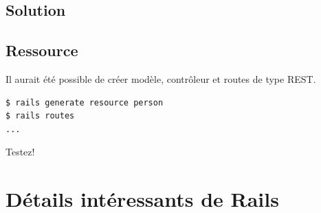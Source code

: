 \hypertarget{solution-4}{%
\subsection{Solution}\label{solution-4}}

\begin{english}

\begin{Shaded}
\begin{Highlighting}[]

\NormalTok{, \textbackslash{}}
\NormalTok{, \textbackslash{}}
    \NormalTok{[}\NormalTok{, }\NormalTok{]}
\end{Highlighting}
\end{Shaded}

\end{english}

\hypertarget{ressource}{%
\subsection{Ressource}\label{ressource}}

Il aurait été possible de créer modèle, contrôleur et routes de type
REST.

\begin{english}

\begin{verbatim}
$ rails generate resource person
$ rails routes
...
\end{verbatim}

\end{english}

Testez!

\hypertarget{duxe9tails-intuxe9ressants-de-rails}{%
\section{Détails intéressants de
Rails}\label{duxe9tails-intuxe9ressants-de-rails}}

